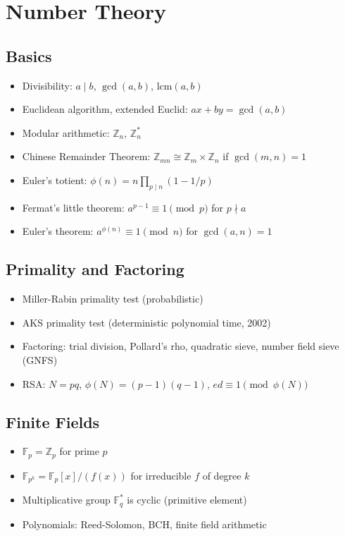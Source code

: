 \section{Number Theory}

\subsection{Basics}
\begin{itemize}
\item Divisibility: $a \mid b$, $\gcd(a,b)$, $\mathrm{lcm}(a,b)$
\item Euclidean algorithm, extended Euclid: $ax+by=\gcd(a,b)$
\item Modular arithmetic: $\mathbb{Z}_n$, $\mathbb{Z}_n^*$
\item Chinese Remainder Theorem: $\mathbb{Z}_{mn} \cong \mathbb{Z}_m \times \mathbb{Z}_n$ if $\gcd(m,n)=1$
\item Euler's totient: $\phi(n) = n \prod_{p\mid n} (1-1/p)$
\item Fermat's little theorem: $a^{p-1} \equiv 1 \pmod p$ for $p \nmid a$
\item Euler's theorem: $a^{\phi(n)} \equiv 1 \pmod n$ for $\gcd(a,n)=1$
\end{itemize}

\subsection{Primality and Factoring}
\begin{itemize}
\item Miller-Rabin primality test (probabilistic)
\item AKS primality test (deterministic polynomial time, 2002)
\item Factoring: trial division, Pollard's rho, quadratic sieve, number field sieve (GNFS)
\item RSA: $N=pq$, $\phi(N)=(p-1)(q-1)$, $ed \equiv 1 \pmod{\phi(N)}$
\end{itemize}

\subsection{Finite Fields}
\begin{itemize}
\item $\mathbb{F}_p = \mathbb{Z}_p$ for prime $p$
\item $\mathbb{F}_{p^k} = \mathbb{F}_p[x]/(f(x))$ for irreducible $f$ of degree $k$
\item Multiplicative group $\mathbb{F}_q^*$ is cyclic (primitive element)
\item Polynomials: Reed-Solomon, BCH, finite field arithmetic
\end{itemize}

